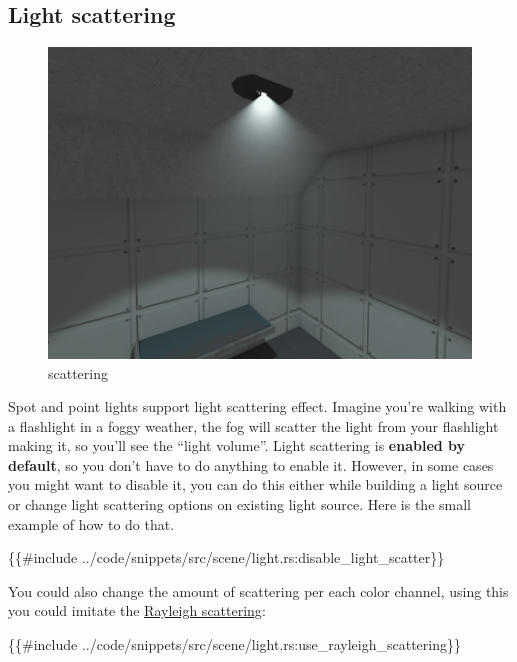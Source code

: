 \documentclass[
]{book}
\newenvironment{Shaded}{\begin{snugshade}}{\end{snugshade}}
\newcommand{\NormalTok}[1]{#1}
\theoremstyle{definition}
\theoremstyle{definition}
\theoremstyle{definition}
\theoremstyle{definition}
\theoremstyle{remark}
\begin{document}
\subsection{Light scattering}\label{light-scattering}

\begin{figure}
\centering
\includegraphics{images/scene_scattering.png}
\caption{scattering}
\end{figure}

Spot and point lights support light scattering effect. Imagine you're walking with a flashlight in a foggy weather, the fog will scatter the light from your flashlight making it, so you'll see the ``light volume''. Light scattering is \textbf{enabled by default}, so you don't have to do anything to enable it. However, in some cases you might want to disable it, you can do this either while building a light source or change light scattering options on existing light source. Here is the small example of how to do that.

\begin{Shaded}
\begin{Highlighting}[]
\NormalTok{\{\{\#include ../code/snippets/src/scene/light.rs:disable\_light\_scatter\}\}}
\end{Highlighting}
\end{Shaded}

You could also change the amount of scattering per each color channel, using this you could imitate the \href{https://en.wikipedia.org/wiki/Rayleigh_scattering}{Rayleigh scattering}:

\begin{Shaded}
\begin{Highlighting}[]
\NormalTok{\{\{\#include ../code/snippets/src/scene/light.rs:use\_rayleigh\_scattering\}\}}
\end{Highlighting}
\end{Shaded}
\end{document}
